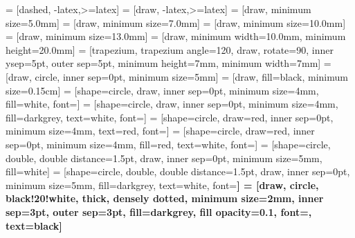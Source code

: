 \usetikzlibrary{calc, arrows, arrows.meta, fit, positioning, patterns, decorations.pathreplacing, shapes, angles}
 = [dashed, -latex,>=latex]
 = [draw, -latex,>=latex]
 = [draw, minimum size=5.0mm]
 = [draw, minimum size=7.0mm]
 = [draw, minimum size=10.0mm]
 = [draw, minimum size=13.0mm]
 = [draw, minimum width=10.0mm, minimum height=20.0mm]
 = [trapezium, trapezium angle=120, draw, rotate=90,  inner ysep=5pt, outer sep=5pt,
minimum height=7mm, minimum width=7mm]
 = [draw, circle, inner sep=0pt, minimum size=5mm]
 = [draw, fill=black, minimum size=0.15cm]
 = [shape=circle, draw, inner sep=0pt, minimum size=4mm, fill=white, font=\scriptsize]
 = [shape=circle, draw, inner sep=0pt, minimum size=4mm, fill=darkgrey, text=white, font=\scriptsize]
 = [shape=circle, draw=red, inner sep=0pt, minimum size=4mm, text=red, font=\scriptsize]
 = [shape=circle, draw=red, inner sep=0pt, minimum size=4mm, fill=red, text=white, font=\scriptsize]
 = [shape=circle, double, double distance=1.5pt, draw, inner sep=0pt, minimum size=5mm, fill=white]
 = [shape=circle, double, double distance=1.5pt, draw, inner sep=0pt, minimum size=5mm, fill=darkgrey, text=white, font=\bfseries]
 = [draw, circle, black!20!white, thick, densely dotted, minimum size=2mm, inner sep=3pt, outer sep=3pt, fill=darkgrey, fill opacity=0.1, font=\tiny, text=black]

\newcommand{\brackets}[4]{
	\draw[dashed, rounded corners=0.3cm, line width = 1pt] ($({#1},{#3})+(-0.3,0)$) -- ($({#1},{#3})+(-0.3,0.3)$) -- ($({#2},{#3})+(0.3,0.3)$) -- ($({#2},{#3})+(0.3,0)$);
	\draw[rounded corners=0.3cm, line width = 1pt] ($({#1},{#4})+(-0.3,0)$) -- ($({#1},{#4})+(-0.3,-0.3)$) -- ($({#2},{#4})+(0.3,-0.3)$) -- ($({#2},{#4})+(0.3,0)$);}

\newcommand{\parentheses}[4]{
      \draw[rounded corners=0.3cm, line width = 0.75pt] ($({#1},{#3})+(0,0.3)$) -- ($({#1},{#3})+(-0.3,0)$) -- ($({#1},{#4})+(-0.3,0)$) -- ($({#1},{#4})+(0,-0.3)$);
      \draw[rounded corners=0.3cm, line width = 0.75pt] ($({#2},{#3})+(0,0.3)$) -- ($({#2},{#3})+(0.3,0)$) -- ($({#2},{#4})+(0.3,0)$) -- ($({#2},{#4})+(0,-0.3)$);}

